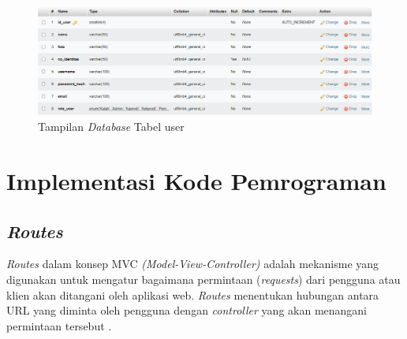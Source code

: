 \begin{enumerate}
        \begin{figure}
          \centering
          \includegraphics[width=0.82\linewidth]{konten//gambar/Tampilan database tabel user.png}
          \caption{Tampilan \textit{Database} Tabel user}
          \label{fig:enter-label}
        \end{figure}

\end{enumerate}

\section{Implementasi Kode Pemrograman}
\subsection{\textit{Routes}}
\textit{Routes} dalam konsep MVC \textit{(Model-View-Controller)} adalah mekanisme yang digunakan untuk mengatur bagaimana permintaan (\textit{requests}) dari pengguna atau klien akan ditangani oleh aplikasi web. \textit{Routes} menentukan hubungan antara URL yang diminta oleh pengguna dengan \textit{controller} yang akan menangani permintaan tersebut \cite{kelvin2022sistem}.

